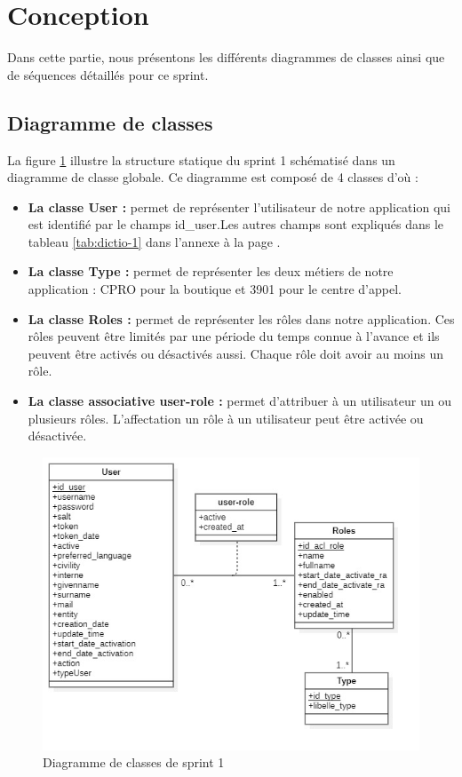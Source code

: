 \section{Conception}
Dans cette partie, nous présentons les différents diagrammes de classes ainsi que de séquences détaillés pour ce sprint.
\subsection{Diagramme de classes}
La figure \ref{fig:classdiag-sprint1} illustre la structure statique du sprint 1 schématisé dans un diagramme de classe globale. Ce diagramme est composé de 4 classes d'où :
\begin{itemize}
	\item \textbf{La classe User :} permet de représenter l'utilisateur de notre application qui est identifié par le champs id\_user.Les autres champs sont expliqués dans le tableau \ref{tab:dictio-1} dans l'annexe à la page \pageref{tab:dictio-1}.
	\item \textbf{La classe Type :} permet de représenter les deux métiers de notre application : CPRO pour la boutique et 3901 pour le centre d'appel.
	\item \textbf{La classe Roles :} permet de représenter les rôles dans notre application. Ces rôles peuvent être limités par une période du temps connue à l'avance et ils peuvent être activés ou désactivés aussi. Chaque rôle doit avoir au moins un rôle.
	\item \textbf{La classe associative user-role :} permet d'attribuer à un utilisateur un ou plusieurs rôles. L'affectation un rôle à un utilisateur peut être activée ou désactivée.
\end{itemize}
\begin{figure}[H]
	\centering
	\includegraphics[width=0.7\linewidth]{img/conception/classes/ClassDiag-sprint1}
	\caption[Diagramme de classes de sprint 1]{Diagramme de classes de sprint 1}
	\label{fig:classdiag-sprint1}
\end{figure}
